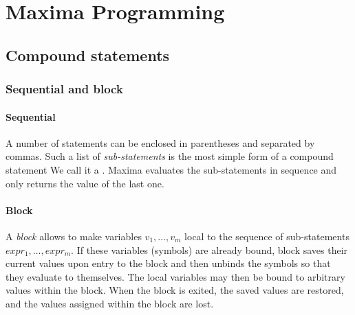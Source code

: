 \documentclass[../Maxima_Workbook.tex]{subfiles}
\begin{document}
\part{Maxima Programming}

\chapter{Compound statements}\label{F5}

\section{Sequential and block}

\subsection{Sequential}

 \hfill {}

\lz A number of statements can be enclosed in parentheses and separated by commas. Such a list of \emph{sub-statements} is the most simple form of a compound statement We call it a . Maxima evaluates the sub-statements in sequence and only returns the value of the last one.

\subsection{Block}

 \hfill \tcr{[function]}


\lz A \emph{block} allows to make variables \emph{$ v_1,\dots, v_m $} local to the sequence of sub-statements \emph{$ expr_1,\dots,expr_m $}. If these variables (symbols) are already bound, block saves their current values upon entry to the block and then unbinds the symbols so that they evaluate to themselves. The local variables may then be bound to arbitrary values within the block. When the block is exited, the saved values are restored, and the values assigned within the block are lost.
\end{document}
